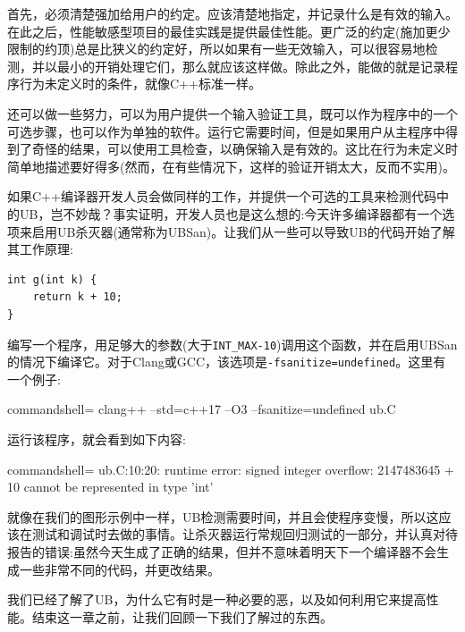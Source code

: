 首先，必须清楚强加给用户的约定。应该清楚地指定，并记录什么是有效的输入。在此之后，性能敏感型项目的最佳实践是提供最佳性能。更广泛的约定(施加更少限制的约顶)总是比狭义的约定好，所以如果有一些无效输入，可以很容易地检测，并以最小的开销处理它们，那么就应该这样做。除此之外，能做的就是记录程序行为未定义时的条件，就像C++标准一样。 

还可以做一些努力，可以为用户提供一个输入验证工具，既可以作为程序中的一个可选步骤，也可以作为单独的软件。运行它需要时间，但是如果用户从主程序中得到了奇怪的结果，可以使用工具检查，以确保输入是有效的。这比在行为未定义时简单地描述要好得多(然而，在有些情况下，这样的验证开销太大，反而不实用)。

如果C++编译器开发人员会做同样的工作，并提供一个可选的工具来检测代码中的UB，岂不妙哉？事实证明，开发人员也是这么想的:今天许多编译器都有一个选项来启用UB杀灭器(通常称为UBSan)。让我们从一些可以导致UB的代码开始了解其工作原理:

\begin{lstlisting}[style=styleCXX]
int g(int k) {
	return k + 10;
}

\end{lstlisting}

编写一个程序，用足够大的参数(大于\texttt{INT\_MAX-10})调用这个函数，并在启用UBSan的情况下编译它。对于Clang或GCC，该选项是\texttt{-fsanitize=undefined}。这里有一个例子:

\begin{tcblisting}{commandshell={}}
clang++ --std=c++17 –O3 –fsanitize=undefined ub.C
\end{tcblisting}

运行该程序，就会看到如下内容:

\begin{tcblisting}{commandshell={}}
ub.C:10:20: runtime error: signed integer overflow: 
        2147483645 + 10 cannot be represented in type 'int'
\end{tcblisting}

就像在我们的图形示例中一样，UB检测需要时间，并且会使程序变慢，所以这应该在测试和调试时去做的事情。让杀灭器运行常规回归测试的一部分，并认真对待报告的错误:虽然今天生成了正确的结果，但并不意味着明天下一个编译器不会生成一些非常不同的代码，并更改结果。

我们已经了解了UB，为什么它有时是一种必要的恶，以及如何利用它来提高性能。结束这一章之前，让我们回顾一下我们了解过的东西。

























